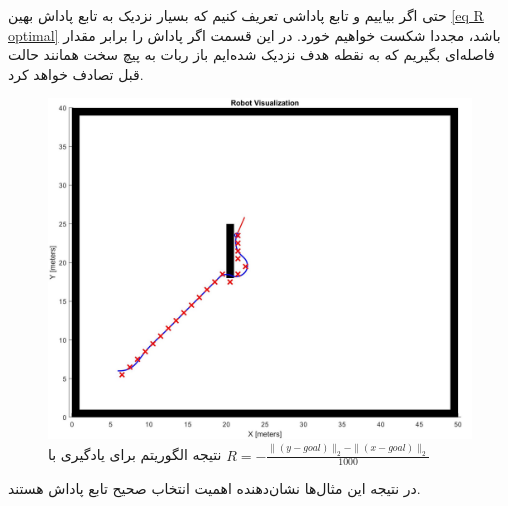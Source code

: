 حتی اگر بیاییم و تابع پاداشی تعریف کنیم که بسیار نزدیک به تابع پاداش بهین \ref{eq R optimal} باشد، مجددا شکست خواهیم خورد. در این قسمت اگر پاداش را برابر مقدار فاصله‌ای بگیریم که به نقطه هدف نزدیک شده‌ایم باز ربات به پیچ سخت همانند حالت قبل تصادف خواهد کرد.
\begin{figure}[!h]
	\centering
	\includegraphics[scale=0.3]{Images/QL path R=-normpos-xy.jpg}
	\caption{نتیجه الگوریتم  برای یادگیری با $R=-\frac{\|(y-goal)\|_2 - \|(x-goal)\|_2}{1000}$}
\end{figure}

در نتیجه این مثال‌ها نشان‌دهنده اهمیت انتخاب صحیح تابع پاداش هستند.














